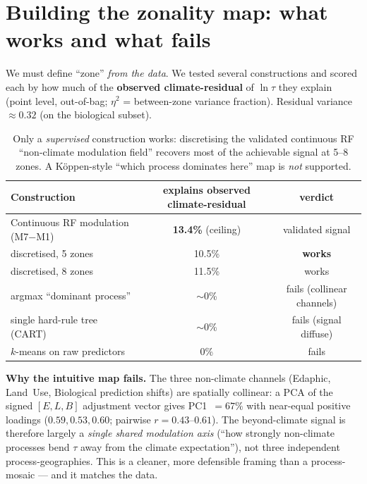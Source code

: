 \documentclass[11pt,a4paper]{article}
\begin{document}
\section{Building the zonality map: what works and what fails}

We must define ``zone'' \emph{from the data}. We tested several constructions and
scored each by how much of the \textbf{observed climate-residual} of
$\ln\tau$ they explain (point level, out-of-bag; $\eta^2$ = between-zone variance
fraction). Residual variance $\approx 0.32$ (on the biological subset).

\begin{table}[h]
\centering
\begin{tabular}{lcc}
\toprule
Construction & explains observed climate-residual & verdict\\
\midrule
Continuous RF modulation (M7$-$M1) & \textbf{13.4\%} (ceiling) & validated signal\\
\quad discretised, 5 zones & 10.5\% & \textbf{works}\\
\quad discretised, 8 zones & 11.5\% & works\\
argmax ``dominant process'' & $\sim$0\% & fails (collinear channels)\\
single hard-rule tree (CART) & $\sim$0\% & fails (signal diffuse)\\
$k$-means on raw predictors & 0\% & fails\\
\bottomrule
\end{tabular}
\caption{Only a \emph{supervised} construction works: discretising the validated
continuous RF ``non-climate modulation field'' recovers most of the achievable
signal at 5--8 zones. A Köppen-style ``which process dominates here'' map is
\emph{not} supported.}
\end{table}

\noindent\textbf{Why the intuitive map fails.} The three non-climate channels
(Edaphic, Land~Use, Biological prediction shifts) are spatially collinear:
a PCA of the signed $[E,L,B]$ adjustment vector gives PC1~$=67\%$ with near-equal
positive loadings ($0.59,0.53,0.60$; pairwise $r=0.43$--$0.61$). The
beyond-climate signal is therefore largely a \emph{single shared modulation axis}
(``how strongly non-climate processes bend $\tau$ away from the climate
expectation''), not three independent process-geographies. This is a cleaner,
more defensible framing than a process-mosaic --- and it matches the data.
\end{document}
